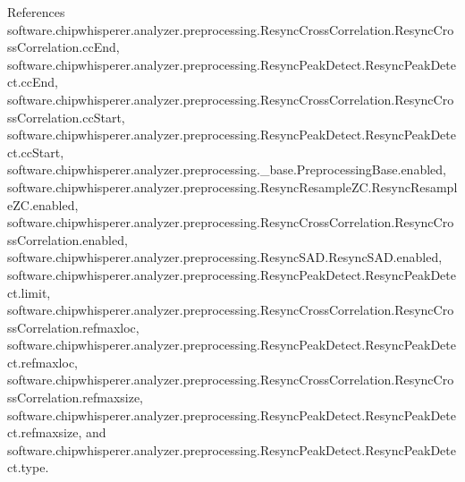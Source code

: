 References software.\+chipwhisperer.\+analyzer.\+preprocessing.\+Resync\+Cross\+Correlation.\+Resync\+Cross\+Correlation.\+cc\+End, software.\+chipwhisperer.\+analyzer.\+preprocessing.\+Resync\+Peak\+Detect.\+Resync\+Peak\+Detect.\+cc\+End, software.\+chipwhisperer.\+analyzer.\+preprocessing.\+Resync\+Cross\+Correlation.\+Resync\+Cross\+Correlation.\+cc\+Start, software.\+chipwhisperer.\+analyzer.\+preprocessing.\+Resync\+Peak\+Detect.\+Resync\+Peak\+Detect.\+cc\+Start, software.\+chipwhisperer.\+analyzer.\+preprocessing.\+\_\+base.\+Preprocessing\+Base.\+enabled, software.\+chipwhisperer.\+analyzer.\+preprocessing.\+Resync\+Resample\+Z\+C.\+Resync\+Resample\+Z\+C.\+enabled, software.\+chipwhisperer.\+analyzer.\+preprocessing.\+Resync\+Cross\+Correlation.\+Resync\+Cross\+Correlation.\+enabled, software.\+chipwhisperer.\+analyzer.\+preprocessing.\+Resync\+S\+A\+D.\+Resync\+S\+A\+D.\+enabled, software.\+chipwhisperer.\+analyzer.\+preprocessing.\+Resync\+Peak\+Detect.\+Resync\+Peak\+Detect.\+limit, software.\+chipwhisperer.\+analyzer.\+preprocessing.\+Resync\+Cross\+Correlation.\+Resync\+Cross\+Correlation.\+refmaxloc, software.\+chipwhisperer.\+analyzer.\+preprocessing.\+Resync\+Peak\+Detect.\+Resync\+Peak\+Detect.\+refmaxloc, software.\+chipwhisperer.\+analyzer.\+preprocessing.\+Resync\+Cross\+Correlation.\+Resync\+Cross\+Correlation.\+refmaxsize, software.\+chipwhisperer.\+analyzer.\+preprocessing.\+Resync\+Peak\+Detect.\+Resync\+Peak\+Detect.\+refmaxsize, and software.\+chipwhisperer.\+analyzer.\+preprocessing.\+Resync\+Peak\+Detect.\+Resync\+Peak\+Detect.\+type.


